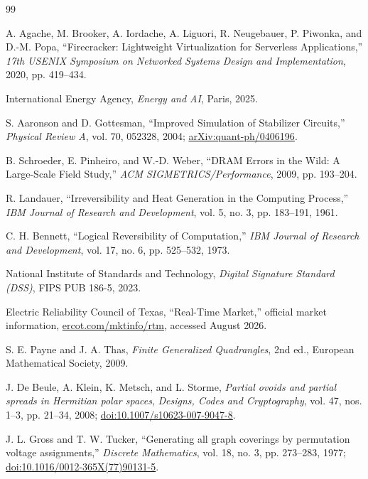 \documentclass[11pt,letterpaper]{article}
\begin{document}
\begin{thebibliography}{99}

A. Agache, M. Brooker, A. Iordache, A. Liguori, R. Neugebauer,
P. Piwonka, and D.-M. Popa,
``Firecracker: Lightweight Virtualization for Serverless Applications,''
\emph{17th USENIX Symposium on Networked Systems Design and Implementation},
2020, pp. 419--434.

International Energy Agency,
\emph{Energy and AI}, Paris, 2025.

S. Aaronson and D. Gottesman,
``Improved Simulation of Stabilizer Circuits,''
\emph{Physical Review A}, vol. 70, 052328, 2004;
\href{https://arxiv.org/abs/quant-ph/0406196}{arXiv:quant-ph/0406196}.

B. Schroeder, E. Pinheiro, and W.-D. Weber,
``DRAM Errors in the Wild: A Large-Scale Field Study,''
\emph{ACM SIGMETRICS/Performance}, 2009, pp. 193--204.

R. Landauer,
``Irreversibility and Heat Generation in the Computing Process,''
\emph{IBM Journal of Research and Development}, vol. 5, no. 3,
pp. 183--191, 1961.

C. H. Bennett,
``Logical Reversibility of Computation,''
\emph{IBM Journal of Research and Development}, vol. 17, no. 6,
pp. 525--532, 1973.

National Institute of Standards and Technology,
\emph{Digital Signature Standard (DSS)}, FIPS PUB 186-5, 2023.

Electric Reliability Council of Texas,
``Real-Time Market,'' official market information,
\href{https://www.ercot.com/mktinfo/rtm}{ercot.com/mktinfo/rtm}, accessed
August 2026.

S. E. Payne and J. A. Thas,
\emph{Finite Generalized Quadrangles}, 2nd ed., European Mathematical
Society, 2009.

J. De Beule, A. Klein, K. Metsch, and L. Storme,
\emph{Partial ovoids and partial spreads in Hermitian polar spaces},
\emph{Designs, Codes and Cryptography}, vol. 47, nos. 1--3,
pp. 21--34, 2008;
\href{https://doi.org/10.1007/s10623-007-9047-8}{doi:10.1007/s10623-007-9047-8}.

J. L. Gross and T. W. Tucker,
``Generating all graph coverings by permutation voltage assignments,''
\emph{Discrete Mathematics}, vol. 18, no. 3, pp. 273--283, 1977;
\href{https://doi.org/10.1016/0012-365X(77)90131-5}{doi:10.1016/0012-365X(77)90131-5}.


\end{thebibliography}
\end{document}
